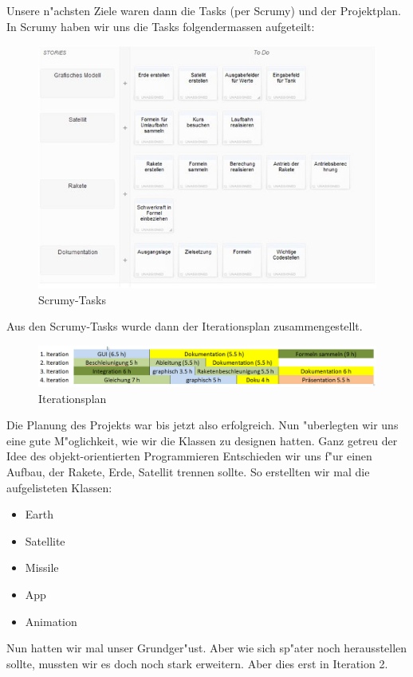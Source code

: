 \documentclass[11pt]{report}
\begin{document}
Unsere n"achsten Ziele waren dann die Tasks (per Scrumy) und der Projektplan. 
In Scrumy haben wir uns die Tasks folgendermassen aufgeteilt:\linebreak
\begin{figure}[H]
\centering
\includegraphics[width=13cm]{Scrumy.jpg}
\caption{Scrumy-Tasks}
\label{fig3}
\end{figure}
\newpage
Aus den Scrumy-Tasks wurde dann der Iterationsplan zusammengestellt.\linebreak
\begin{figure}[H]
\centering
\includegraphics[width=13cm]{Projektplan.jpg}
\caption{Iterationsplan}
\label{fig4}
\end{figure}
Die Planung des Projekts war bis jetzt also erfolgreich. Nun "uberlegten wir uns eine gute M"oglichkeit, wie wir die Klassen zu designen hatten. Ganz getreu der Idee des objekt-orientierten Programmieren Entschieden wir uns f"ur einen Aufbau, der Rakete, Erde, Satellit trennen sollte. So erstellten wir mal die aufgelisteten Klassen:
\begin{itemize}
\item Earth
\item Satellite
\item Missile
\item App
\item Animation
\end{itemize}
\newpage
Nun hatten wir mal unser Grundger"ust. Aber wie sich sp"ater noch herausstellen sollte, mussten wir es doch noch stark erweitern. Aber dies erst in Iteration 2.\linebreak
\end{document}
